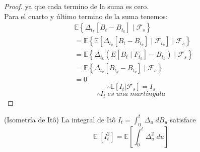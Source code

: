 \documentclass[11pt,notitlepage]{article}
\begin{document}
\begin{proof}
ya que cada termino de la suma es cero.\\
Para el cuarto y último termino de la suma tenemos:
\begin{align*}
& \mathbb{E}\left \{  \Delta_{t_k}[ B_t-B_{t_{k}}]  \mid \mathcal{F}_s\right \}\\
&= \mathbb{E}\left \{ \mathbb{E}[\Delta_{t_k}[B_t-B_{t_{k}}] \mid \mathcal{F}_{t_{k}}] \mid \mathcal{F}_s\right \}\\
&= \mathbb{E}\left \{\Delta_{t_k} (E[ B_t \mid F_{t_{k}}]-B_{t_{k}}) \mid \mathcal{F}_s\right \}\\
&= \mathbb{E}\left \{\Delta_{t_k}  [B_{t_{k}}-B_{t_{k}}] \mid \mathcal{F}_s\right \}\\
&=0
\end{align*}
\[\therefore \mathbb{E}[I_{t}| \mathcal{F}_{s}]=I_{s}\]
\[\therefore I_{t} \; es\; una \; martingala\]
\end{proof}


\begin{teor} (Isometría de Itô)
La integral de Itô \(I_{t}=\int_{0}^{t}\;\Delta_{u}\;dB_u\) satisface
\[\mathbb{E}\;[I^{2}_{t}]=\mathbb{E}\left[\int_{0}^{t}\Delta^{2}_{u}\;du\right]\]
\end{teor}
\end{document}
